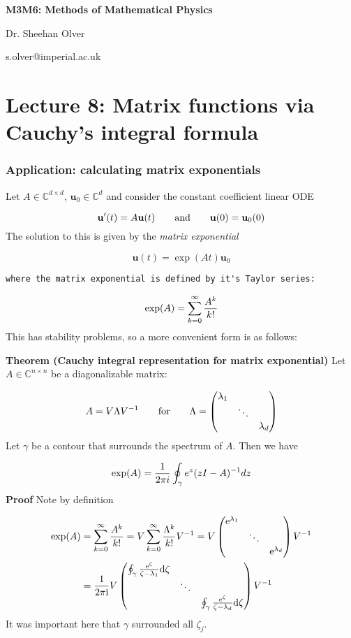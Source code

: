 \documentclass[12pt,a4paper]{article}
\def\D{ {\rm d} }
\def\I{ {\rm i} }
\def\E{ {\rm e} }
\begin{document}
\textbf{M3M6: Methods of Mathematical Physics}

Dr. Sheehan Olver

s.olver@imperial.ac.uk

\section{Lecture 8: Matrix  functions via Cauchy's integral formula}
\subsubsection{Application: calculating matrix exponentials}
Let $A \in {\mathbb C}^{d \times d}$,   ${\mathbf u}_0 \in {\mathbb C}^d$ and consider the constant coefficient linear ODE

\[
    {\mathbf u}'(t) = A {\mathbf u}(t)\qquad\hbox{and}\qquad {\mathbf u}(0) = {\mathbf u}_0(0)
\]
The solution to this is given by the \emph{matrix exponential}

\[
    {\mathbf u}(t) = \exp(A t) {\mathbf u}_0
\]
\begin{verbatim}
where the matrix exponential is defined by it's Taylor series:
\end{verbatim}
\[
    \exp(A) = \sum_{k=0}^\infty {A^k \over k!}
\]
This has stability problems, so a more convenient form is as follows:

\textbf{Theorem (Cauchy integral representation for matrix exponential)} Let $A \in {\mathbb C}^{n \times n}$ be a diagonalizable matrix:

\[
    A = V \Lambda V^{-1} \qquad\hbox{for}\qquad\Lambda =
    \begin{pmatrix}\lambda_1 \cr &\ddots \cr && \lambda_d\end{pmatrix}
\]
Let $\gamma$ be a contour that surrounds the spectrum of $A$. Then we have

\[
    \exp(A) = {1 \over 2 \pi i} \oint_\gamma e^z (z I - A)^{-1} dz
\]
\textbf{Proof} Note by definition


\begin{align*}
\exp(A) &= \sum_{k=0}^\infty {A^k \over k!} = V \sum_{k=0}^\infty {\Lambda^k \over k!}V^{-1} = V \begin{pmatrix} \E^{\lambda_1}\\ & \ddots \\ && \E^{\lambda_d} \end{pmatrix} V^{-1}  \\
&= {1 \over 2\pi \I} V \begin{pmatrix} \oint_\gamma {\E^\zeta \over \zeta - \lambda_1 } \D\zeta \\ & \ddots \\ && \oint_\gamma {\E^\zeta \over \zeta - \lambda_d } \D\zeta\end{pmatrix} V^{-1} 
\end{align*}
It was important here that $\gamma$ surrounded all $\zeta_j$.
\end{document}
